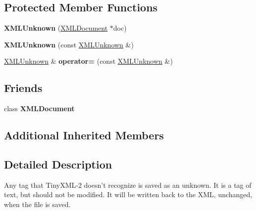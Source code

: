 \subsection*{Protected Member Functions}
\begin{DoxyCompactItemize}
\item 
\hypertarget{classtinyxml2_1_1_x_m_l_unknown_a9391eb679598d50baba424e6f1aa367b}{{\bfseries X\-M\-L\-Unknown} (\hyperlink{classtinyxml2_1_1_x_m_l_document}{X\-M\-L\-Document} $\ast$doc)}\label{classtinyxml2_1_1_x_m_l_unknown_a9391eb679598d50baba424e6f1aa367b}

\item 
\hypertarget{classtinyxml2_1_1_x_m_l_unknown_aab31a93c95a7cedc9597cea7caffa73f}{{\bfseries X\-M\-L\-Unknown} (const \hyperlink{classtinyxml2_1_1_x_m_l_unknown}{X\-M\-L\-Unknown} \&)}\label{classtinyxml2_1_1_x_m_l_unknown_aab31a93c95a7cedc9597cea7caffa73f}

\item 
\hypertarget{classtinyxml2_1_1_x_m_l_unknown_a6137d5611db42c35de3d869f66555e5b}{\hyperlink{classtinyxml2_1_1_x_m_l_unknown}{X\-M\-L\-Unknown} \& {\bfseries operator=} (const \hyperlink{classtinyxml2_1_1_x_m_l_unknown}{X\-M\-L\-Unknown} \&)}\label{classtinyxml2_1_1_x_m_l_unknown_a6137d5611db42c35de3d869f66555e5b}

\end{DoxyCompactItemize}
\subsection*{Friends}
\begin{DoxyCompactItemize}
\item 
\hypertarget{classtinyxml2_1_1_x_m_l_unknown_a4eee3bda60c60a30e4e8cd4ea91c4c6e}{class {\bfseries X\-M\-L\-Document}}\label{classtinyxml2_1_1_x_m_l_unknown_a4eee3bda60c60a30e4e8cd4ea91c4c6e}

\end{DoxyCompactItemize}
\subsection*{Additional Inherited Members}


\subsection{Detailed Description}
Any tag that Tiny\-X\-M\-L-\/2 doesn't recognize is saved as an unknown. It is a tag of text, but should not be modified. It will be written back to the X\-M\-L, unchanged, when the file is saved.

